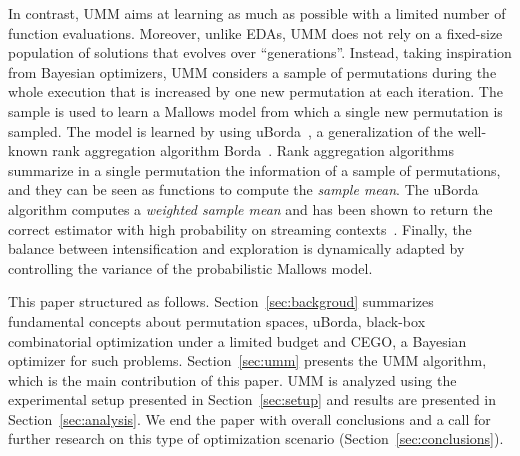 \documentclass[runningheads]{llncs}
\begin{document}
In contrast, UMM aims at learning as much as possible with a limited number of
function evaluations. Moreover, unlike EDAs, UMM does not rely on a fixed-size
population of solutions that evolves over ``generations''. Instead, taking
inspiration from Bayesian optimizers, UMM considers a sample of permutations
during the whole execution that is increased by one new permutation at each
iteration. The sample is used to learn a Mallows model from which a single new
permutation is sampled. The model is learned by using
uBorda~\cite{IruLobPer2020arxiv}, a generalization of the well-known rank
aggregation algorithm Borda~\cite{Borda1781}. Rank aggregation algorithms
summarize in a single permutation the information of a sample of permutations,
and they can be seen as functions to compute the \emph{sample mean}. The uBorda
algorithm computes a \textit{weighted sample mean} and has been shown to return
the correct estimator with high probability on streaming
contexts~\cite{IruLobPer2020arxiv}.
%
Finally, the balance between intensification and exploration is dynamically
adapted by controlling the variance of the probabilistic Mallows model.



This paper structured as follows. Section~\ref{sec:backgroud} summarizes fundamental concepts about permutation spaces, uBorda, black-box combinatorial optimization under a limited budget and CEGO, a Bayesian optimizer for such problems. Section~\ref{sec:umm} presents the UMM algorithm, which is the main contribution of this paper. UMM is analyzed using the experimental setup presented in Section~\ref{sec:setup} and results are presented in Section~\ref{sec:analysis}. We end the paper with overall conclusions and a call for further research on this type of optimization scenario (Section~\ref{sec:conclusions}).
\end{document}
